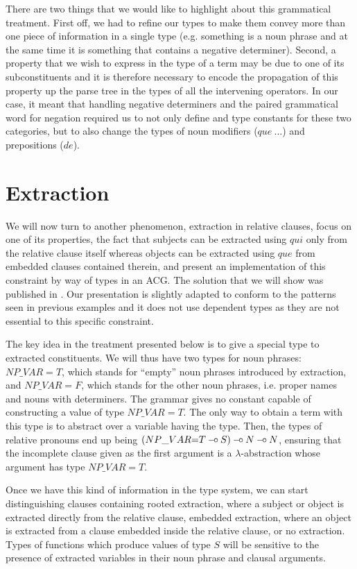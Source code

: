 There are two things that we would like to highlight about this
grammatical treatment. First off, we had to refine our types to make
them convey more than one piece of information in a single type
(e.g. something is a noun phrase and at the same time it is something
that contains a negative determiner). Second, a property that we wish to
express in the type of a term may be due to one of its subconstituents
and it is therefore necessary to encode the propagation of this property
up the parse tree in the types of all the intervening operators. In our
case, it meant that handling negative determiners and the paired
grammatical word for negation required us to not only define and type
constants for these two categories, but to also change the types of noun
modifiers ($que\ ...$) and prepositions ($de$).


\section{Extraction}
\label{sec:extraction}

We will now turn to another phenomenon, extraction in relative clauses,
focus on one of its properties, the fact that subjects can be extracted
using $qui$ only from the relative clause itself whereas objects can be
extracted using $que$ from embedded clauses contained therein, and
present an implementation of this constraint by way of types in an
ACG. The solution that we will show was published in
\cite{pogodalla2012controlling}. Our presentation is slightly adapted to
conform to the patterns seen in previous examples and it does not use
dependent types as they are not essential to this specific constraint.

The key idea in the treatment presented below is to give a special type
to extracted constituents. We will thus have two types for noun phrases:
$NP\_VAR{=}T$, which stands for ``empty'' noun phrases introduced by
extraction, and $NP\_VAR{=}F$, which stands for the other noun phrases,
i.e.  proper names and nouns with determiners. The grammar gives no
constant capable of constructing a value of type $NP\_VAR{=}T$. The only
way to obtain a term with this type is to abstract over a variable
having the type. Then, the types of relative pronouns end up being
$(NP\_VAR{=}T \mathbin{{-}\mkern-3.5mu{\circ}} S) \mathbin{{-}\mkern-3.5mu{\circ}} N \mathbin{{-}\mkern-3.5mu{\circ}} N$, ensuring that the incomplete
clause given as the first argument is a $\lambda$-abstraction whose
argument has type $NP\_VAR{=}T$.

Once we have this kind of information in the type system, we can start
distinguishing clauses containing rooted extraction, where a subject or
object is extracted directly from the relative clause, embedded
extraction, where an object is extracted from a clause embedded inside
the relative clause, or no extraction. Types of functions which produce
values of type $S$ will be sensitive to the presence of extracted
variables in their noun phrase and clausal arguments.

